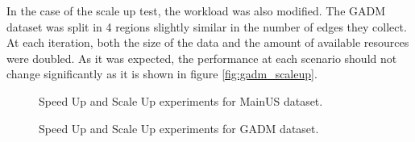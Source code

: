 In the case of the scale up test, the workload was also modified.  The GADM dataset was split in 4 regions slightly similar in the number of edges they collect.  At each iteration, both the size of the data and the amount of available resources were doubled. As it was expected, the performance at each scenario should not change significantly as it is shown in figure \ref{fig:gadm_scaleup}.

\begin{figure}[!ht]
    \centering
    \hfill
    \caption{Speed Up and Scale Up experiments for MainUS dataset.} \label{fig:mainus_speed_scale}
\end{figure}


\begin{figure}[!ht]
    \centering
    \hfill
    \caption{Speed Up and Scale Up experiments for GADM dataset.} \label{fig:gadm_speed_scale}
\end{figure}
